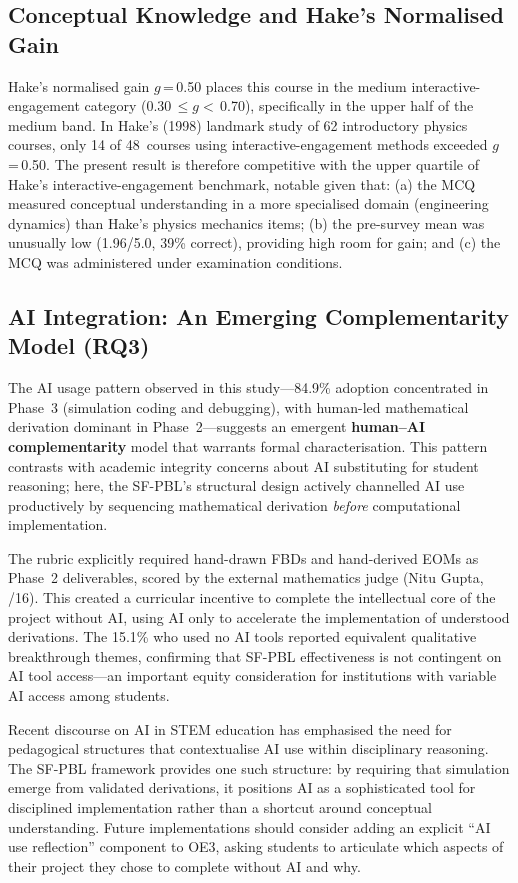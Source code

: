 \documentclass[utf8]{FrontiersinHarvard}
\begin{document}
\subsection{Conceptual Knowledge and Hake's Normalised Gain}

Hake's normalised gain $g$\,=\,0.50 places this course in the medium
interactive-engagement category \citep{hake1998interactive} (0.30\,$\leq g
<$\,0.70), specifically in the upper half of the medium band. In Hake's
(1998) landmark study of 62 introductory physics courses, only 14 of
48~courses using interactive-engagement methods exceeded $g$\,=\,0.50. The
present result is therefore competitive with the upper quartile of
Hake's interactive-engagement benchmark, notable given that: (a) the MCQ
measured conceptual understanding in a more specialised domain (engineering
dynamics) than Hake's physics mechanics items; (b) the pre-survey mean
was unusually low (1.96/5.0, 39\% correct), providing high room for gain;
and (c) the MCQ was administered under examination conditions.

\subsection{AI Integration: An Emerging Complementarity Model (RQ3)}

The AI usage pattern observed in this study---84.9\% adoption concentrated
in Phase~3 (simulation coding and debugging), with human-led mathematical
derivation dominant in Phase~2---suggests an emergent
\textbf{human--AI complementarity} model that warrants formal characterisation.
This pattern contrasts with academic integrity concerns about AI substituting
for student reasoning; here, the SF-PBL's structural design actively
channelled AI use productively by sequencing mathematical derivation
\textit{before} computational implementation.

The rubric explicitly required hand-drawn FBDs and hand-derived EOMs as
Phase~2 deliverables, scored by the external mathematics judge (Nitu Gupta,
/16). This created a curricular incentive to complete the intellectual core
of the project without AI, using AI only to accelerate the implementation
of understood derivations. The 15.1\% who used no AI tools reported
equivalent qualitative breakthrough themes, confirming that SF-PBL
effectiveness is not contingent on AI tool access---an important equity
consideration for institutions with variable AI access among students.

Recent discourse on AI in STEM education \citep{tlili2023chatgpt,
farrokhnia2024swot} has emphasised the need for pedagogical structures that
contextualise AI use within disciplinary reasoning. The SF-PBL framework
provides one such structure: by requiring that simulation emerge from
validated derivations, it positions AI as a sophisticated tool for
disciplined implementation rather than a shortcut around conceptual
understanding. Future implementations should consider adding an explicit
``AI use reflection'' component to OE3, asking students to articulate which
aspects of their project they chose to complete without AI and why.
\end{document}
